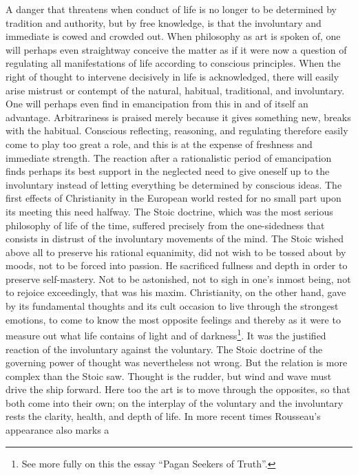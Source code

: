 \documentclass[12pt,a4paper,openany]{book}
\newcommand{\opage}[1]{\marginnote{\footnotesize\textit{[#1]}}}
\begin{document}
A danger that threatens when conduct of life is no longer to be
determined by tradition and authority, but by free
knowledge, is that the involuntary and immediate is cowed
\opage{190}and crowded out. When philosophy as art is spoken of,
one will perhaps even straightway conceive the matter as if it were now a question
of regulating all manifestations of life according to conscious principles.
When the right of thought to intervene decisively in life
is acknowledged, there will easily arise mistrust or contempt of
the natural, habitual, traditional, and involuntary. One
will perhaps even find in emancipation from this in and of itself an advantage.
Arbitrariness is praised merely because it gives
something new, breaks with the habitual. Conscious reflecting,
reasoning, and regulating therefore easily come to play
too great a role, and this is at the expense of freshness and
immediate strength. The reaction after a rationalistic
period of emancipation finds perhaps its best support in the neglected
need to give oneself up to the involuntary instead of
letting everything be determined by conscious ideas.
The first effects of Christianity in the European world rested
for no small part upon its meeting this need halfway.
The Stoic doctrine, which was the most serious philosophy of life of the time,
suffered precisely from the one-sidedness that consists in distrust of
the involuntary movements of the mind. The Stoic wished above all to
preserve his rational equanimity, did not wish to be tossed about by
moods, not to be forced into passion. He sacrificed fullness and
depth in order to preserve self-mastery. Not to be astonished, not
to sigh in one's inmost being, not to rejoice exceedingly, that was his
maxim. Christianity, on the other hand, gave by its fundamental thoughts
and its cult occasion to live through the strongest
emotions, to come to know the most opposite feelings
and thereby as it were to measure out what life contains of light
and of darkness\footnote{See more fully on this the essay ``Pagan Seekers of Truth''.}. It was the justified reaction of the involuntary
against the voluntary. The Stoic doctrine of the governing
power of thought was nevertheless not wrong. But the relation is more
complex than the Stoic saw. Thought is the rudder, but wind
and wave must drive the ship forward. Here too the art is to
move through the opposites, so that both
come into their own; on the interplay of the voluntary and
the involuntary rests the clarity, health, and depth of life.
\opage{191}In more recent times Rousseau's appearance also marks a
\end{document}
